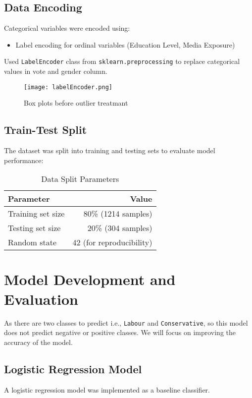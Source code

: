 \documentclass[12pt]{article}
\begin{document}
\subsection{Data Encoding}
Categorical variables were encoded using:
\begin{itemize}
    \item Label encoding for ordinal variables (Education Level, Media Exposure)
\end{itemize}

Used \texttt{LabelEncoder} class from \texttt{sklearn.preprocessing} to replace categorical values in vote and gender column.

\begin{figure}[H]
    \centering
    \texttt{[image: labelEncoder.png]}
    \caption{Box plots before outlier treatmant }
    \label{fig:example}
\end{figure}

\subsection{Train-Test Split}
The dataset was split into training and testing sets to evaluate model performance:

\begin{table}[H]
\centering
\caption{Data Split Parameters}
\label{tab:data_split}
\begin{tabular}{lr}
\toprule
\textbf{Parameter} & \textbf{Value} \\
\midrule
Training set size & 80\% (1214 samples) \\
Testing set size & 20\% (304 samples) \\
Random state & 42 (for reproducibility) \\
\bottomrule
\end{tabular}
\end{table}

\section{Model Development and Evaluation}

As there are two classes to predict i.e., \texttt{Labour} and \texttt{Conservative}, so this model does not predict negative or positive classes. We will focus on improving the accuracy of the model.

\subsection{Logistic Regression Model}
A logistic regression model was implemented as a baseline classifier.
\end{document}
